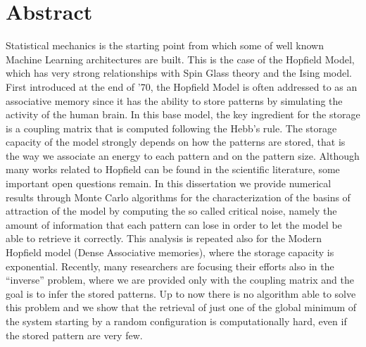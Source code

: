 \chapter*{Abstract}
Statistical mechanics is the starting point from which some of well known Machine Learning architectures are built. This is the case of the Hopfield Model, which has very strong relationships with Spin Glass theory and the Ising model. First introduced at the end of '70, the Hopfield Model is often addressed to as an associative memory since it has the ability to store patterns by simulating the activity of the human brain. In this base model, the key ingredient for the storage is a coupling matrix that is computed following the Hebb's rule. The storage capacity of the model strongly depends on how the patterns are stored, that is the way we associate an energy to each pattern and on the pattern size. Although many works related to Hopfield can be found in the scientific literature, some important open questions remain. In this dissertation we provide numerical results through Monte Carlo algorithms for the characterization of the basins of attraction of the model by computing the so called critical noise, namely the amount of information that each pattern can lose in order to let the model be able to retrieve it correctly. This analysis is repeated also for the Modern Hopfield model (Dense Associative memories), where the storage capacity is exponential.
Recently, many researchers are focusing their efforts also in the ``inverse'' problem, where we are provided only with the coupling matrix and the goal is to infer the stored patterns. Up to now there is no algorithm able to solve this problem and we show that the retrieval of just one of the global minimum of the system starting by a random configuration is computationally hard, even if the stored pattern are very few.